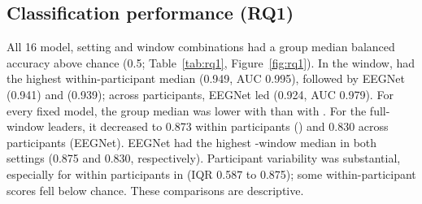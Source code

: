 \subsection{Classification performance (RQ1)}
\label{sec:res-rq1}
All 16 model, setting and window combinations had a group median balanced accuracy above chance (0.5; Table~\ref{tab:rq1}, Figure~\ref{fig:rq1}). In the  window,  had the highest within-participant median (0.949, AUC 0.995), followed by EEGNet (0.941) and  (0.939); across participants, EEGNet led (0.924, AUC 0.979). For every fixed model, the group median was lower with  than with . For the full-window leaders, it decreased to 0.873 within participants () and 0.830 across participants (EEGNet). EEGNet had the highest -window median in both settings (0.875 and 0.830, respectively). Participant variability was substantial, especially for  within participants in  (IQR 0.587 to 0.875); some within-participant  scores fell below chance. These comparisons are descriptive.

